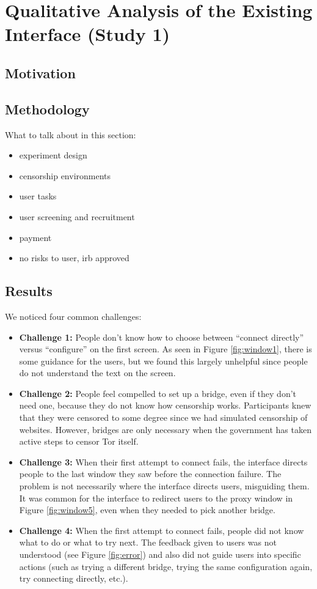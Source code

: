 \documentclass{template}
\begin{document}
\section{Qualitative Analysis of the Existing Interface (Study 1)}
\subsection{Motivation} 
\subsection{Methodology} 
{\color {red} 
What to talk about in this section: 
\begin{itemize} \itemsep1pt \parskip0pt  
\item experiment design
\item censorship environments
\item user tasks
\item user screening and recruitment
\item payment
\item no risks to user, irb approved
\end{itemize} 
}

\subsection{Results} 
{\color {red}
We noticed four common challenges:  

\begin{itemize} \itemsep1pt \parskip0pt 
\item {\bfseries Challenge 1:} People don't know how to choose between ``connect directly'' versus ``configure'' on the first screen. As seen in Figure \ref{fig:window1}, there is some guidance for the users, but we found this largely unhelpful since people do not understand the text on the screen. 
\item {\bfseries Challenge 2:} People feel compelled to set up a bridge, even if they don't need one, because they do not know how censorship works. Participants knew that they were censored to some degree since we had simulated censorship of websites. However, bridges are only necessary when the government has taken active steps to censor Tor itself.
\item {\bfseries Challenge 3:} When their first attempt to connect fails, the interface directs people to the last window they saw before the connection failure. The problem is not necessarily where the interface directs users, misguiding them. It was common for the interface to redirect users to the proxy window in Figure \ref{fig:window5}, even when they needed to pick another bridge. 
\item {\bfseries Challenge 4:} When the first attempt to connect fails, people did not know what to do or what to try next. The feedback given to users was not understood (see Figure \ref{fig:error}) and also did not guide users into specific actions (such as trying a different bridge, trying the same configuration again, try connecting directly, etc.).
\end{itemize}
}
\end{document}
